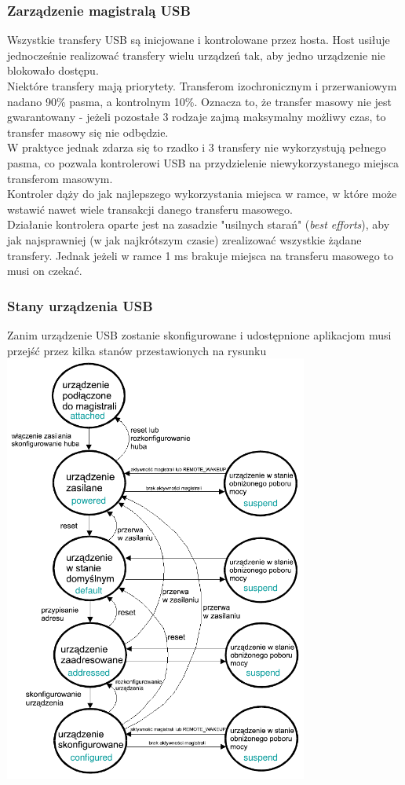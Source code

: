 		\subsubsection{Zarządzenie magistralą USB}
		Wszystkie transfery USB są inicjowane i kontrolowane przez hosta. Host usiłuje jednocześnie realizować transfery wielu urządzeń tak, aby jedno urządzenie nie blokowało dostępu.\\ 
		Niektóre transfery mają priorytety. Transferom izochronicznym i przerwaniowym nadano 90\% pasma, a kontrolnym 10\%. Oznacza to, że transfer masowy nie jest gwarantowany - jeżeli pozostałe 3 rodzaje zajmą maksymalny możliwy czas, to transfer masowy się nie odbędzie.\\
		W praktyce jednak zdarza się to rzadko i 3 transfery nie wykorzystują pełnego pasma, co pozwala kontrolerowi USB na przydzielenie niewykorzystanego miejsca transferom masowym.\\
		Kontroler dąży do jak najlepszego wykorzystania miejsca w ramce, w które może wstawić nawet wiele transakcji danego transferu masowego.\\
		Działanie kontrolera oparte jest na zasadzie "usilnych starań" (\emph{best efforts}), aby jak najsprawniej (w jak najkrótszym czasie) zrealizować wszystkie żądane transfery. Jednak jeżeli w ramce 1 ms brakuje miejsca na transferu masowego to musi on czekać.
		\newpage
		\subsubsection{Stany urządzenia USB}
		Zanim urządzenie USB zostanie skonfigurowane i udostępnione aplikacjom musi przejść przez kilka stanów przestawionych na rysunku\\
		\includegraphics[width=10cm]{./wyklady/USB_16_1.pdf}
